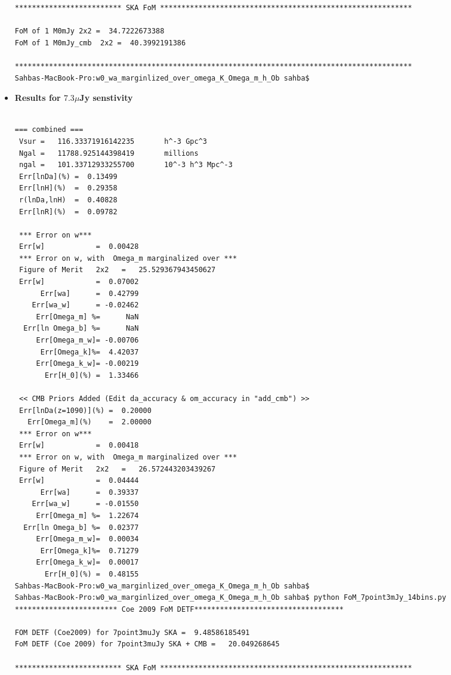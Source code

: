 \documentclass[11pt]{amsart}
\begin{document}
\begin{itemize}
\begin{verbatim}
************************* SKA FoM ***********************************************************

FoM of 1 M0mJy 2x2 =  34.7222673388
FoM of 1 M0mJy_cmb  2x2 =  40.3992191386

*********************************************************************************************
Sahbas-MacBook-Pro:w0_wa_marginlized_over_omega_K_Omega_m_h_Ob sahba$
\end{verbatim}

\item\textbf{ Results for $7.3 \mu$Jy senstivity }
\begin{verbatim}

=== combined ===
 Vsur =   116.33371916142235       h^-3 Gpc^3
 Ngal =   11788.925144398419       millions
 ngal =   101.33712933255700       10^-3 h^3 Mpc^-3
 Err[lnDa](%) =  0.13499
 Err[lnH](%)  =  0.29358
 r(lnDa,lnH)  =  0.40828
 Err[lnR](%)  =  0.09782

 *** Error on w***
 Err[w]            =  0.00428
 *** Error on w, with  Omega_m marginalized over ***
 Figure of Merit   2x2   =   25.529367943450627
 Err[w]            =  0.07002
      Err[wa]      =  0.42799
    Err[wa_w]      = -0.02462
     Err[Omega_m] %=      NaN
  Err[ln Omega_b] %=      NaN
     Err[Omega_m_w]= -0.00706
      Err[Omega_k]%=  4.42037
     Err[Omega_k_w]= -0.00219
       Err[H_0](%) =  1.33466

 << CMB Priors Added (Edit da_accuracy & om_accuracy in "add_cmb") >>
 Err[lnDa(z=1090)](%) =  0.20000
   Err[Omega_m](%)    =  2.00000
 *** Error on w***
 Err[w]            =  0.00418
 *** Error on w, with  Omega_m marginalized over ***
 Figure of Merit   2x2   =   26.572443203439267
 Err[w]            =  0.04444
      Err[wa]      =  0.39337
    Err[wa_w]      = -0.01550
     Err[Omega_m] %=  1.22674
  Err[ln Omega_b] %=  0.02377
     Err[Omega_m_w]=  0.00034
      Err[Omega_k]%=  0.71279
     Err[Omega_k_w]=  0.00017
       Err[H_0](%) =  0.48155
Sahbas-MacBook-Pro:w0_wa_marginlized_over_omega_K_Omega_m_h_Ob sahba$
Sahbas-MacBook-Pro:w0_wa_marginlized_over_omega_K_Omega_m_h_Ob sahba$ python FoM_7point3mJy_14bins.py
************************ Coe 2009 FoM DETF***********************************

FOM DETF (Coe2009) for 7point3muJy SKA =  9.48586185491
FoM DETF (Coe 2009) for 7point3muJy SKA + CMB =   20.049268645

************************* SKA FoM ***********************************************************


\end{verbatim}
\end{itemize}
\end{document}

